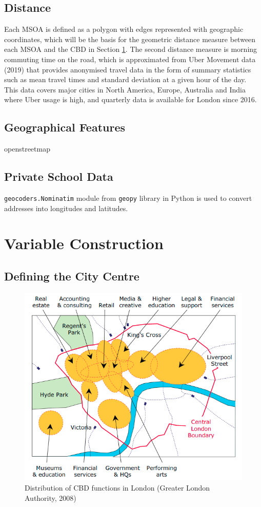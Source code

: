 \documentclass{article}
\begin{document}
\subsection{Distance}
Each MSOA is defined as a polygon with edges represented with geographic coordinates, which will be the basis for the geometric distance measure between each MSOA and the CBD in Section \ref{section:variables}. The second distance measure is morning commuting time on the road, which is approximated from Uber Movement data (2019) that provides anonymised travel data in the form of summary statistics such as mean travel times and standard deviation at a given hour of the day. This data covers major cities in North America, Europe, Australia and India where Uber usage is high, and quarterly data is available for London since 2016.

\subsection{Geographical Features}
openstreetmap

\subsection{Private School Data}
\texttt{geocoders.Nominatim} module from \texttt{geopy} library in Python is used to convert addresses into longitudes and latitudes.

\section{Variable Construction} \label{section:variables}
\subsection{Defining the City Centre}
\begin{figure}[H]
  \centering
  \includegraphics[width=0.5\linewidth]{images/cbd.png}
  \caption{Distribution of CBD functions in London (Greater London Authority, 2008)}
  \label{fig:cbd}
\end{figure}
\end{document}
